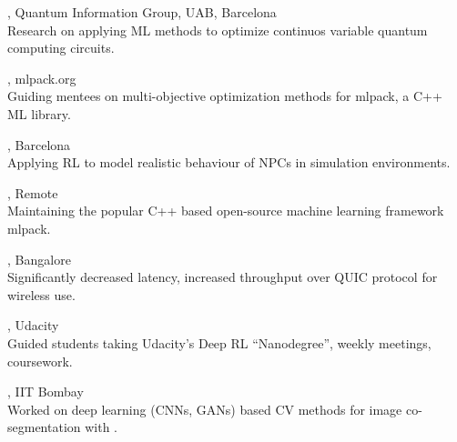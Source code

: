 \documentclass[mm]{simple_style}
\begin{document}
\begin{resume}
\vspace{-4.5ex}

, Quantum Information Group, UAB, Barcelona \\
Research on applying ML methods to optimize continuos variable quantum computing circuits.\\

\vspace{-4.5ex}

, mlpack.org \\
Guiding mentees on multi-objective optimization methods for mlpack, a C++ ML library.\\

\vspace{-4.5ex}

, Barcelona \\
Applying RL to model realistic behaviour of NPCs in simulation environments.\\

\vspace{-4.5ex}

, Remote \\
Maintaining the popular C++ based open-source machine learning framework mlpack.\\

\vspace{-4.5ex}

, Bangalore \\
Significantly decreased latency, increased throughput over QUIC protocol for wireless use.\\

\vspace{-4.5ex}

, Udacity \\
Guided students taking Udacity's Deep RL ``Nanodegree'', weekly meetings, coursework.\\

\vspace{-4.5ex}

, IIT Bombay \\
Worked on deep learning (CNNs, GANs) based CV methods for image co-segmentation with .\\


\end{resume}
\end{document}
